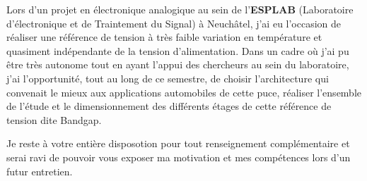 \documentclass[11pt,a4paper]{moderncv}
\begin{document}
\hspace{0.8cm} Lors d'un projet en électronique analogique au sein de l'\textbf{ESPLAB} (Laboratoire d'électronique et de Traintement du Signal) à Neuchâtel, j'ai eu l'occasion de réaliser une référence de tension à très faible variation en température et quasiment indépendante de la tension d'alimentation. Dans un cadre où j'ai pu être très autonome tout en ayant l'appui des chercheurs au sein du laboratoire, j'ai l'opportunité, tout au long de ce semestre, de choisir l'architecture qui convenait le mieux aux applications automobiles de cette puce, réaliser l'ensemble de l'étude et le dimensionnement des différents étages de cette référence de tension dite Bandgap.\newline{}


Je reste à votre entière disposotion pour tout renseignement complémentaire et serai ravi de pouvoir vous exposer ma motivation et mes compétences lors d'un futur entretien.\newline{}

\makeletterclosing %
\end{document}
